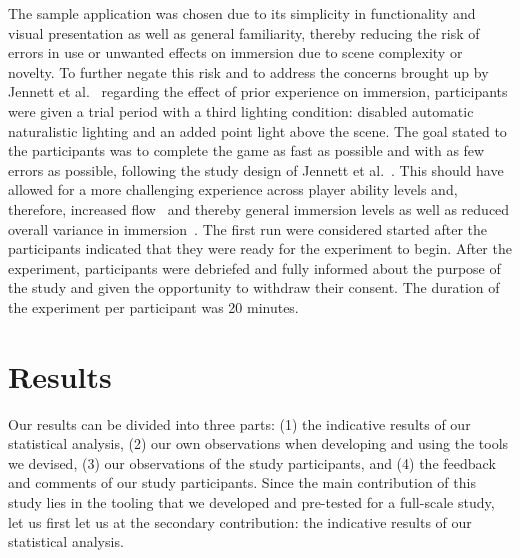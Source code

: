 \documentclass[12pt,twoside,english]{article}
\begin{document}
The sample application was chosen due to its simplicity in functionality and visual presentation as well as general familiarity, thereby reducing the risk of errors in use or unwanted effects on immersion due to scene complexity or novelty.
To further negate this risk and to address the concerns brought up by Jennett et al.~\cite{jennett_measuring_2008} regarding the effect of prior experience on immersion, participants were given a trial period with a third lighting condition: disabled automatic naturalistic lighting and an added point light above the scene.
The goal stated to the participants was to complete the game as fast as possible and with as few errors as possible, following the study design of Jennett et al.~\cite{jennett_measuring_2008}.
This should have allowed for a more challenging experience across player ability levels and, therefore, increased flow~\cite{csikszentmihalyi_flow_1990} and thereby general immersion levels as well as reduced overall variance in immersion~\cite{jennett_measuring_2008}.
The first run were considered started after the participants indicated that they were ready for the experiment to begin.
After the experiment, participants were debriefed and fully informed about the purpose of the study and given the opportunity to withdraw their consent.
The duration of the experiment per participant was 20 minutes.

\section{Results}
\label{sect:results}

Our results can be divided into three parts: (1) the indicative results of our statistical analysis, (2) our own observations when developing and using the tools we devised, (3) our observations of the study participants, and (4) the feedback and comments of our study participants.
Since the main contribution of this study lies in the tooling that we developed and pre-tested for a full-scale study, let us first let us at the secondary contribution: the indicative results of our statistical analysis.
\end{document}
